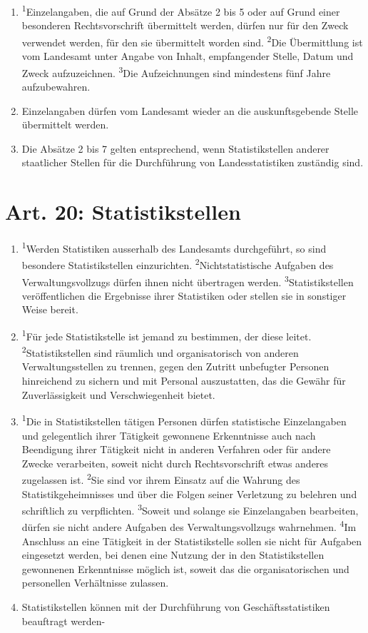 \begin{enumerate}[label=(\arabic*)]
            \item \textsuperscript{1}Einzelangaben, die auf Grund der Absätze 2 bis 5 oder auf Grund einer besonderen Rechtsvorschrift übermittelt werden, dürfen nur für den Zweck verwendet werden, für den sie über\-mittelt worden sind. \textsuperscript{2}Die Übermittlung ist vom Landesamt unter Angabe von Inhalt, empfangender Stelle, Datum und Zweck aufzuzeichnen. \textsuperscript{3}Die Aufzeichnungen sind mindestens fünf Jahre aufzubewahren.
            \item Einzelangaben dürfen vom Landesamt wieder an die auskunftsgebende Stelle über\-mittelt werden. 
            \item Die Absätze 2 bis 7 gelten entsprechend, wenn Statistikstellen anderer staatlicher Stellen für die Durchführung von Landesstatistiken zuständig sind. 
        \end{enumerate}
        
    \section{Art. 20: Statistikstellen}
        \begin{enumerate}[label=(\arabic*)]
            \item \textsuperscript{1}Werden Statistiken ausserhalb des Landesamts durchgeführt, so sind besondere Statistikstellen einzurichten. \textsuperscript{2}Nichtstatistische Aufgaben des Verwaltungsvollzugs dürfen ihnen nicht übertragen werden. \textsuperscript{3}Statistikstellen veröffentlichen die Ergebnisse ihrer Statistiken oder stellen sie in sonstiger Weise bereit.
            \item \textsuperscript{1}Für jede Statistikstelle ist jemand zu bestimmen, der diese leitet. \textsuperscript{2}Statistikstellen sind räumlich und organisatorisch von anderen Verwaltungsstellen zu trennen, gegen den Zutritt unbefugter Personen hinreichend zu sichern und mit Personal auszustatten, das die Gewähr für Zuverlässigkeit und Verschwiegenheit bietet.
            \item \textsuperscript{1}Die in Statistikstellen tätigen Personen dürfen statistische Einzelangaben und gelegentlich ihrer Tätigkeit gewonnene Erkenntnisse auch nach Beendigung ihrer Tätigkeit nicht in anderen Verfahren oder für andere Zwecke verarbeiten, soweit nicht durch Rechtsvorschrift etwas anderes zugelassen ist. \textsuperscript{2}Sie sind vor ihrem Einsatz auf die Wahrung des Statistikgeheimnisses und über die Folgen seiner Verletzung zu belehren und schriftlich zu verpflichten. \textsuperscript{3}Soweit und solange sie Einzelangaben bearbeiten, dürfen sie nicht andere Aufgaben des Verwaltungsvollzugs wahrnehmen. \textsuperscript{4}Im Anschluss an eine Tätigkeit in der Statistikstelle sollen sie nicht für Aufgaben eingesetzt werden, bei denen eine Nutzung der in den Statistikstellen gewonnenen Erkenntnisse möglich ist, soweit das die organisatorischen und personellen Verhältnisse zulassen.
            \item Statistikstellen können mit der Durchführung von Geschäftsstatistiken beauftragt werden-
        \end{enumerate}



